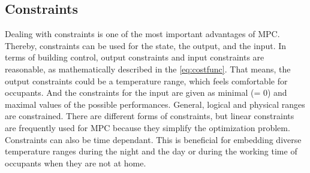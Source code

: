 \subsection{Constraints}
\label{subsection:constraints}

Dealing with constraints is one of the most important advantages of MPC. Thereby, constraints can be used for the state, the output, and the input. In terms of building control, output constraints and input constraints are reasonable, as mathematically described in the \autoref{eq:costfunc}. That means, the output constraints could be a temperature range, which feels comfortable for occupants. And the constraints for the input are given as minimal (= 0) and maximal values of the possible performances. General, logical and physical ranges are constrained. There are different forms of constraints, but linear constraints are frequently used for MPC because they simplify the optimization problem. Constraints can also be time dependant. This is beneficial for embedding diverse temperature ranges during the night and the day or during the working time of occupants when they are not at home.
\cite{Siroky.2011}
